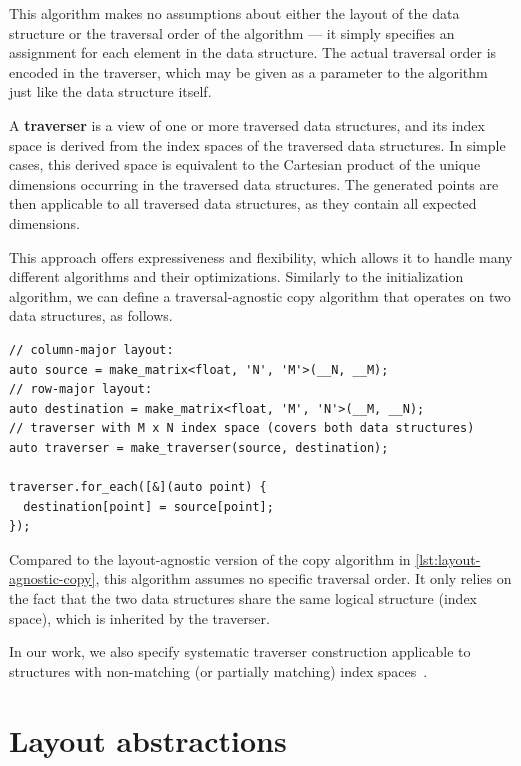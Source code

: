 This algorithm makes no assumptions about either the layout of the data structure or the traversal order of the algorithm --- it simply specifies an assignment for each element in the data structure. The actual traversal order is encoded in the traverser, which may be given as a parameter to the algorithm just like the data structure itself.

A \textbf{traverser} is a view of one or more traversed data structures, and its index space is derived from the index spaces of the traversed data structures. In simple cases, this derived space is equivalent to the Cartesian product of the unique dimensions occurring in the traversed data structures. The generated points are then applicable to all traversed data structures, as they contain all expected dimensions.

This approach offers expressiveness and flexibility, which allows it to handle many different algorithms and their optimizations. Similarly to the initialization algorithm, we can define a traversal-agnostic copy algorithm that operates on two data structures, as follows.

\begin{lstlisting}[style=C++, caption={A traversal-agnostic copy algorithm}, label={lst:traversal-agnostic-copy}]
// column-major layout:
auto source = make_matrix<float, 'N', 'M'>(__N, __M);
// row-major layout:
auto destination = make_matrix<float, 'M', 'N'>(__M, __N);
// traverser with M x N index space (covers both data structures)
auto traverser = make_traverser(source, destination);

traverser.for_each([&](auto point) {
  destination[point] = source[point];
});
\end{lstlisting}

Compared to the layout-agnostic version of the copy algorithm in \cref{lst:layout-agnostic-copy}, this algorithm assumes no specific traversal order. It only relies on the fact that the two data structures share the same logical structure (index space), which is inherited by the traverser.

In our work, we also specify systematic traverser construction applicable to structures with non-matching (or partially matching) index spaces~\cite{klepl2024pure}.


\section{Layout abstractions}\label{sec:astute-approach}

